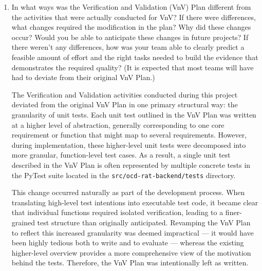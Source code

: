 \documentclass[12pt, titlepage]{article}
\begin{document}
\begin{enumerate}
  System components that were independent of domain expertise, such as the 
  API behaviour under various error conditions, or connectivity with external systems 
  including the LLM and the FRDR database were major portions of the document that 
  could be completed without client input. In these cases, the team was equipped to discern the
  expections of the product without external validation. In these cases where the team was able to 
  self-validate certain subsystems, we still ensured indirect supervisor validation, typically via an 
  interactive demo of the corresponding feature tied to the subsystem. 

  \item In what ways was the Verification and Validation (VnV) Plan different
  from the activities that were actually conducted for VnV? If there were
  differences, what changes required the modification in the plan? Why did
  these changes occur? Would you be able to anticipate these changes in future
  projects? If there weren't any differences, how was your team able to clearly
  predict a feasible amount of effort and the right tasks needed to build the
  evidence that demonstrates the required quality?
  (It is expected that most teams will have had to deviate from their original 
  VnV Plan.)

  The Verification and Validation activities conducted during this project 
  deviated from the original VnV Plan in one primary structural way: the 
  granularity of unit tests. Each unit test outlined in the VnV Plan was 
  written at a higher level of abstraction, generally corresponding to one 
  core requirement or function that might map to several requirements. 
  However, during implementation, these higher-level unit tests were 
  decomposed into more granular, function-level test cases. As a result, 
  a single unit test described in the VnV Plan is often represented by 
  multiple concrete tests in the PyTest suite located in the 
  \texttt{src/ocd-rat-backend/tests} directory.

  This change occurred naturally as part of the development process. When 
  translating high-level test intentions into executable test code, it 
  became clear that individual functions required isolated verification, 
  leading to a finer-grained test structure than originally anticipated. 
  Revamping the VnV Plan to reflect this increased granularity was 
  deemed impractical --- it would have been highly tedious both to write 
  and to evaluate --- whereas the existing higher-level overview provides 
  a more comprehensive view of the motivation behind the tests. Therefore, 
  the VnV Plan was intentionally left as written.


\end{enumerate}
\end{document}
